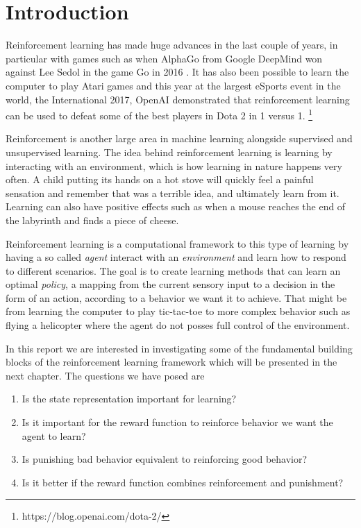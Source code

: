 \documentclass[report.tex]{subfiles}
\begin{document}
    \section*{\centering Introduction}

    Reinforcement learning has made huge advances in the last couple of years, in particular with games such as when AlphaGo from Google DeepMind won against Lee Sedol in the game Go in 2016 \cite{silver2016mastering}. It has also been possible to learn the computer to play Atari games \cite{mnih2013playing} and this year at the largest eSports event in the world, the International 2017, OpenAI demonstrated that reinforcement learning can be used to defeat some of the best players in Dota 2 in 1 versus 1. \footnote{https://blog.openai.com/dota-2/}

    Reinforcement is another large area in machine learning alongside supervised and unsupervised learning. The idea behind reinforcement learning is learning by interacting with an environment, which is how learning in nature happens very often. A child putting its hands on a hot stove will quickly feel a painful sensation and remember that was a terrible idea, and ultimately learn from it. Learning can also have positive effects such as when a mouse reaches the end of the labyrinth and finds a piece of cheese.

    Reinforcement learning is a computational framework to this type of learning by having a so called \textit{agent} interact with an \textit{environment} and learn how to respond to different scenarios. The goal is to create learning methods that can learn an optimal \textit{policy}, a mapping from the current sensory input to a decision in the form of an action, according to a behavior we want it to achieve. That might be from learning the computer to play tic-tac-toe to more complex behavior such as flying a helicopter where the agent do not posses full control of the environment.

    In this report we are interested in investigating some of the fundamental building blocks of the reinforcement learning framework which will be presented in the next chapter. The questions we have posed are

    \begin{enumerate}
        \item Is the state representation important for learning?
        \item Is it important for the reward function to reinforce behavior we want the agent to learn?
        \item Is punishing bad behavior equivalent to reinforcing good behavior?
        \item Is it better if the reward function combines reinforcement and punishment?
    \end{enumerate}
\end{document}
